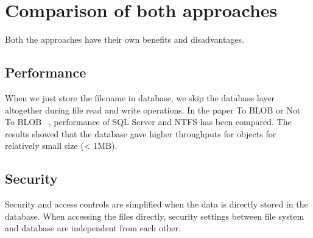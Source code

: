 \section{Comparison of both approaches}
Both the approaches have their own benefits and disadvantages.

\subsection{Performance}
When we just store the filename in database, we skip the database layer altogether during file read and write operations. In the paper To BLOB or Not To BLOB ~\cite{sears2007blob}, performance of SQL Server and NTFS has been compared. The results showed that the database gave higher throughputs for objects for relatively small size (< 1MB).

\subsection{Security}
Security and access controls are simplified when the data is directly stored in the database. When accessing the files directly, security settings between file system and database are independent from each other.
